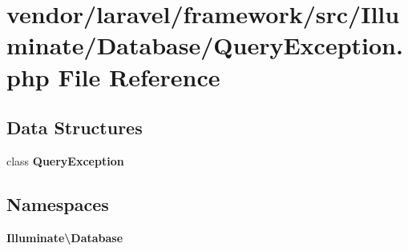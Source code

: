 \section{vendor/laravel/framework/src/\+Illuminate/\+Database/\+Query\+Exception.php File Reference}
\label{_query_exception_8php}
\subsection*{Data Structures}
\begin{DoxyCompactItemize}
\item 
class {\bf Query\+Exception}
\end{DoxyCompactItemize}
\subsection*{Namespaces}
\begin{DoxyCompactItemize}
\item 
 {\bf Illuminate\textbackslash{}\+Database}
\end{DoxyCompactItemize}
